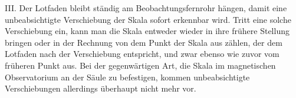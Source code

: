 III. Der Lotfaden bleibt ständig am Beobachtungsfernrohr hängen, damit eine unbeabsichtigte Verschiebung der Skala sofort erkennbar wird. Tritt eine solche Verschiebung ein, kann man die Skala entweder wieder in ihre frühere Stellung bringen oder in der Rechnung von dem Punkt der Skala aus zählen, der dem Lotfaden nach der Verschiebung entspricht, und zwar ebenso wie zuvor vom früheren Punkt aus. Bei der gegenwärtigen Art, die Skala im magnetischen Observatorium an der Säule zu befestigen, kommen unbeabsichtigte Verschiebungen allerdings überhaupt nicht mehr vor.


